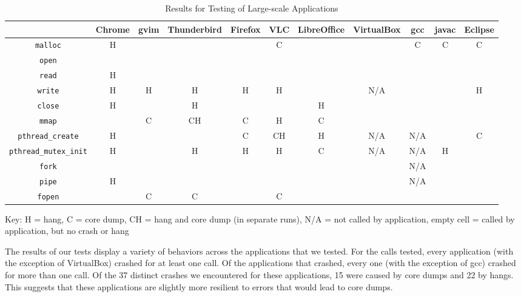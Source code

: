 \begin{table}[h!]
\centering
\caption{Results for Testing of Large-scale Applications}
		\begin{adjustbox}{width=\textwidth}
		\begin{tabular}{|c|c|c|c|c|c|c|c|c|c|c|}
			\hline
			& Chrome & gvim & Thunderbird & Firefox & VLC & LibreOffice & VirtualBox & gcc & javac & Eclipse\\
			\hline
			\texttt{malloc} & H & & & & C &  & & C & C & C \\ \hline
			\texttt{open} & & & & & & & & & & \\ \hline
			\texttt{read} & H & & & & & & & & & \\ \hline
			\texttt{write} & H & H & H & H & H & & N/A& & & H \\ \hline
			\texttt{close} & H & & H & & & H & & & & \\ \hline
			\texttt{mmap} & & C & CH & C & H & C & & & &\\ \hline
			\texttt{pthread\_create}& H & &  & C & CH & H & N/A& N/A& & C \\ \hline
			\texttt{pthread\_mutex\_init} & H & & H & H & H & C & N/A& N/A & H &  \\ \hline
			\texttt{fork} & & & & & & & & N/A & & \\ \hline
			\texttt{pipe} & H & & & & & &  & N/A & &\\ \hline
			\texttt{fopen} & & C & C & & C & & & & & \\ \hline
		\end{tabular} 
		\end{adjustbox}
		Key: H = hang, C = core dump, CH = hang and core dump (in separate runs), N/A = not called by application, empty cell = called by application, but no crash or hang
\label{table:large_scale}
\end{table}

The results of our tests display a variety of behaviors across the applications that we tested. For the calls tested, every application (with the exception of VirtualBox) crashed for at least one call. Of the applications that crashed, every one (with the exception of gcc) crashed for more than one call. Of the 37 distinct crashes we encountered for these applications, 15 were caused by core dumps and 22 by hangs. This suggests that these applications are slightly more resilient to errors that would lead to core dumps. 

